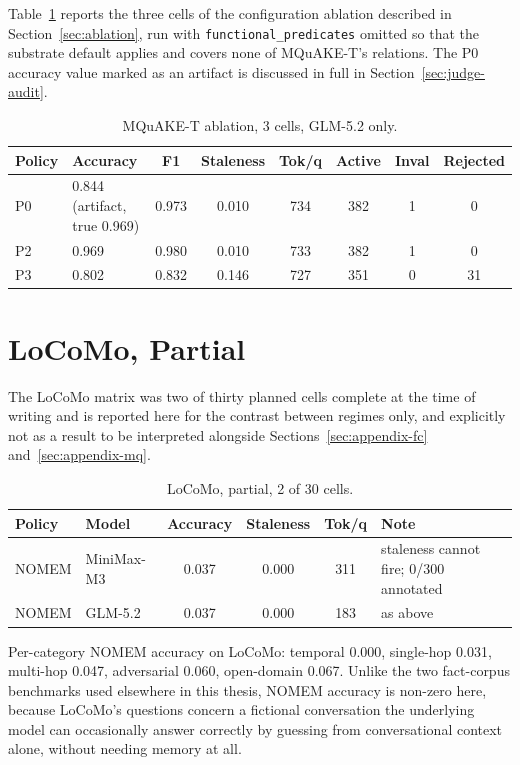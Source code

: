 Table~\ref{tab:appendix-ablation} reports the three cells of the configuration ablation described in Section~\ref{sec:ablation}, run with \texttt{functional\_predicates} omitted so that the substrate default applies and covers none of MQuAKE-T's relations. The P0 accuracy value marked as an artifact is discussed in full in Section~\ref{sec:judge-audit}.

\begin{table}[H]
\centering
\caption{MQuAKE-T ablation, 3 cells, GLM-5.2 only.}
\label{tab:appendix-ablation}
\small
\begin{tabular}{lp{3cm}cccccc}
\toprule
Policy & Accuracy & F1 & Staleness & Tok/q & Active & Inval & Rejected \\
\midrule
P0 & 0.844 (artifact, true 0.969) & 0.973 & 0.010 & 734 & 382 & 1 & 0 \\
P2 & 0.969 & 0.980 & 0.010 & 733 & 382 & 1 & 0 \\
P3 & 0.802 & 0.832 & 0.146 & 727 & 351 & 0 & 31 \\
\bottomrule
\end{tabular}
\end{table}

\section{LoCoMo, Partial}
\label{sec:appendix-locomo}

The LoCoMo matrix was two of thirty planned cells complete at the time of writing and is reported here for the contrast between regimes only, and explicitly not as a result to be interpreted alongside Sections~\ref{sec:appendix-fc} and~\ref{sec:appendix-mq}.

\begin{table}[H]
\centering
\caption{LoCoMo, partial, 2 of 30 cells.}
\label{tab:appendix-locomo}
\small
\begin{tabular}{llcccp{3.6cm}}
\toprule
Policy & Model & Accuracy & Staleness & Tok/q & Note \\
\midrule
NOMEM & MiniMax-M3 & 0.037 & 0.000 & 311 & staleness cannot fire; 0/300 annotated \\
NOMEM & GLM-5.2 & 0.037 & 0.000 & 183 & as above \\
\bottomrule
\end{tabular}
\end{table}

Per-category NOMEM accuracy on LoCoMo: temporal 0.000, single-hop 0.031, multi-hop 0.047, adversarial 0.060, open-domain 0.067. Unlike the two fact-corpus benchmarks used elsewhere in this thesis, NOMEM accuracy is non-zero here, because LoCoMo's questions concern a fictional conversation the underlying model can occasionally answer correctly by guessing from conversational context alone, without needing memory at all.

